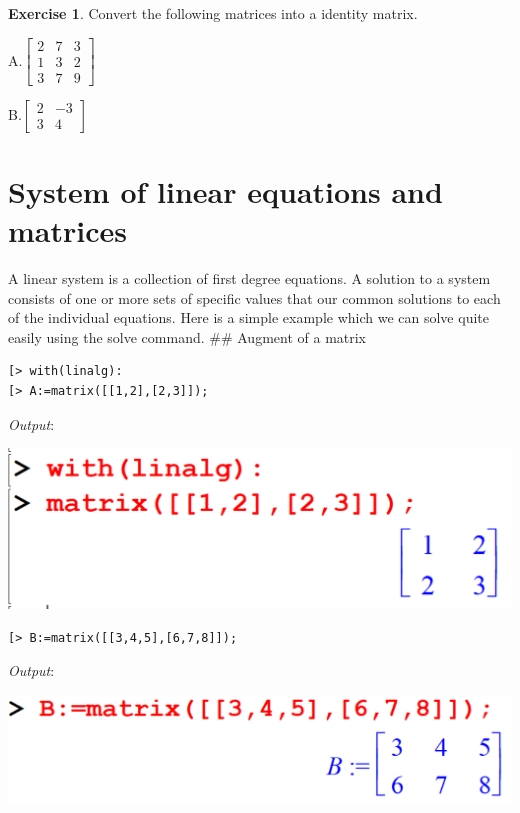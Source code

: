 \documentclass[
]{book}
\theoremstyle{definition}
\theoremstyle{definition}
\theoremstyle{definition}
\newtheorem{exercise}{Exercise}[chapter]
\theoremstyle{definition}
\theoremstyle{remark}
\begin{document}
\begin{exercise}
\protect\hypertarget{exr:unnamed-chunk-5}{}\label{exr:unnamed-chunk-5}Convert the following matrices into a identity matrix.

A.\(\begin{bmatrix} 2 & 7 & 3 \\ 1 & 3 & 2 \\  3 & 7 & 9\end{bmatrix}\)

B.\(\begin{bmatrix} 2 & -3 \\  3 & 4 \end{bmatrix}\)
\end{exercise}

\chapter{System of linear equations and matrices}\label{system-of-linear-equations-and-matrices}

A linear system is a collection of first degree equations. A solution to a system consists of one or more sets of specific values that our common solutions to each of the individual equations. Here is a simple example which we can solve quite easily using the solve command.
\#\# Augment of a matrix

\begin{verbatim}
[> with(linalg):
[> A:=matrix([[1,2],[2,3]]);
\end{verbatim}

\emph{Output}:

\includegraphics{figures/Lesson 5/fig1.png}

\begin{verbatim}
[> B:=matrix([[3,4,5],[6,7,8]]);
\end{verbatim}

\emph{Output}:

\includegraphics{figures/Lesson 5/fig2.png}
\end{document}
